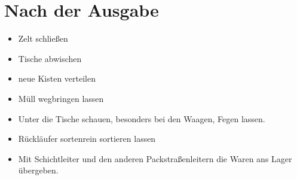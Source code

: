 \documentclass[a4paper]{scrartcl}
\begin{document}
\newpage
\section*{Nach der Ausgabe}
\begin{itemize}
\item Zelt schließen
\item Tische abwischen
\item neue Kisten verteilen
\item Müll wegbringen lassen
\item Unter die Tische schauen, besonders bei den Waagen, Fegen lassen.
\item Rückläufer sortenrein sortieren lassen
\item Mit Schichtleiter und den anderen Packstraßenleitern die Waren ans Lager übergeben.
\end{itemize}
\end{document}

